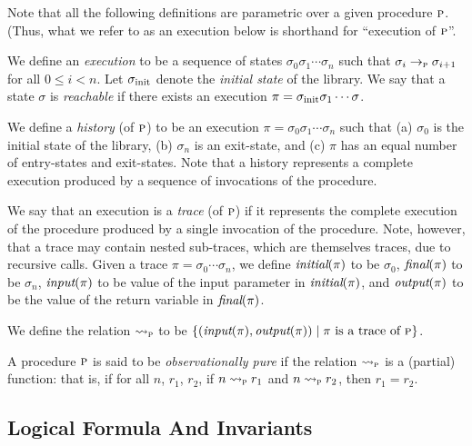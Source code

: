 Note that all the following definitions are parametric over a given procedure $\textsc{p}$.
(Thus, what we refer to as an execution below is shorthand for ``execution of $\textsc{p}$''.

We define an \emph{execution} to be a sequence of states $\sigma_0 \sigma_1 \cdots \sigma_n$ such that
$\sigma_i \rightarrow_{\textsc{p}} \sigma_{i+1}$ for all $0 \leq i < n$.
Let $\sigma_{\text{init}}$ denote the \emph{initial state} of the library.
We say that a state $\sigma$ is \emph{ reachable} if there exists an execution $\pi = \sigma_{\text{init}} \sigma_1 \cdots \sigma$.

We define a \emph{history} (of $\textsc{p}$) to be an execution $\pi = \sigma_0 \sigma_1 \cdots \sigma_n$ such that
(a) $\sigma_0$ is the initial state of the library,
(b) $\sigma_n$ is an exit-state, and
(c) $\pi$ has an equal number of entry-states and exit-states.
Note that a history represents a complete  execution produced by a
sequence of invocations of the procedure.

We say that an execution is a \emph{trace} (of $\textsc{p}$) if it represents the complete execution
of the procedure produced by a single invocation of the procedure.
Note, however, that a trace may contain nested sub-traces,
which are themselves traces, due to recursive calls.
Given a trace $\pi = \sigma_0 \cdots \sigma_n$, we define
$\textit{initial}(\pi)$ to be $\sigma_0$,
$\textit{final}(\pi)$ to be $\sigma_n$,
$\textit{input}(\pi)$ to be value of the input parameter in $\textit{initial}(\pi)$,
and $\textit{output}(\pi)$ to be the value of the return variable in $\textit{final}(\pi)$.

We define the relation $\rightsquigarrow_{\textsc{p}}$ to be $\{ (\textit{input}(\pi),\textit{output}(\pi)) \; | \; \pi \text{ is a trace of } \textsc{p} \}$.

\begin{definition}
A procedure $\textsc{p}$ is said to be \emph{observationally pure} if the relation $\rightsquigarrow_{\textsc{p}}$ is a (partial) function:
that is, if for all $n$, $r_1$, $r_2$, if  $n \rightsquigarrow_{\textsc{p}} r_1$ and $n \rightsquigarrow_{\textsc{p}} r_2$, then $r_1 = r_2$.
\end{definition}

\subsection*{Logical Formula And Invariants}

